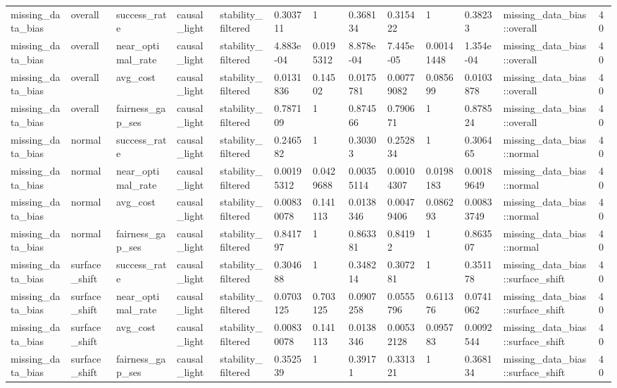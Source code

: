 \begin{tabular}{lllllllllllll}
missing\_data\_bias & overall & success\_rate & causal\_light & stability\_filtered & 0.303711 & 1 & 0.368134 & 0.315422 & 1 & 0.38233 & missing\_data\_bias::overall & 40 \\
missing\_data\_bias & overall & near\_optimal\_rate & causal\_light & stability\_filtered & 4.883e-04 & 0.0195312 & 8.878e-04 & 7.445e-05 & 0.00141448 & 1.354e-04 & missing\_data\_bias::overall & 40 \\
missing\_data\_bias & overall & avg\_cost & causal\_light & stability\_filtered & 0.0131836 & 0.14502 & 0.0175781 & 0.00779082 & 0.085699 & 0.0103878 & missing\_data\_bias::overall & 40 \\
missing\_data\_bias & overall & fairness\_gap\_ses & causal\_light & stability\_filtered & 0.787109 & 1 & 0.874566 & 0.790671 & 1 & 0.878524 & missing\_data\_bias::overall & 40 \\
missing\_data\_bias & normal & success\_rate & causal\_light & stability\_filtered & 0.246582 & 1 & 0.30303 & 0.252834 & 1 & 0.306465 & missing\_data\_bias::normal & 40 \\
missing\_data\_bias & normal & near\_optimal\_rate & causal\_light & stability\_filtered & 0.00195312 & 0.0429688 & 0.00355114 & 0.00104307 & 0.0198183 & 0.00189649 & missing\_data\_bias::normal & 40 \\
missing\_data\_bias & normal & avg\_cost & causal\_light & stability\_filtered & 0.00830078 & 0.141113 & 0.0138346 & 0.00479406 & 0.086293 & 0.00833749 & missing\_data\_bias::normal & 40 \\
missing\_data\_bias & normal & fairness\_gap\_ses & causal\_light & stability\_filtered & 0.841797 & 1 & 0.863381 & 0.84192 & 1 & 0.863507 & missing\_data\_bias::normal & 40 \\
missing\_data\_bias & surface\_shift & success\_rate & causal\_light & stability\_filtered & 0.304688 & 1 & 0.348214 & 0.307281 & 1 & 0.351178 & missing\_data\_bias::surface\_shift & 40 \\
missing\_data\_bias & surface\_shift & near\_optimal\_rate & causal\_light & stability\_filtered & 0.0703125 & 0.703125 & 0.0907258 & 0.0555796 & 0.611376 & 0.0741062 & missing\_data\_bias::surface\_shift & 40 \\
missing\_data\_bias & surface\_shift & avg\_cost & causal\_light & stability\_filtered & 0.00830078 & 0.141113 & 0.0138346 & 0.00532128 & 0.095783 & 0.0092544 & missing\_data\_bias::surface\_shift & 40 \\
missing\_data\_bias & surface\_shift & fairness\_gap\_ses & causal\_light & stability\_filtered & 0.352539 & 1 & 0.39171 & 0.331321 & 1 & 0.368134 & missing\_data\_bias::surface\_shift & 40 \\

\end{tabular}
